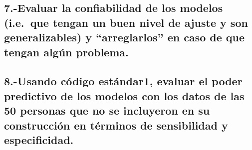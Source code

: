 \documentclass[
]{article}
\begin{document}
\subsection{7.-Evaluar la confiabilidad de los modelos (i.e.~que tengan
un buen nivel de ajuste y son generalizables) y ``arreglarlos'' en caso
de que tengan algún
problema.}\label{evaluar-la-confiabilidad-de-los-modelos-i.e.-que-tengan-un-buen-nivel-de-ajuste-y-son-generalizables-y-arreglarlos-en-caso-de-que-tengan-alguxfan-problema.}

\subsection{8.-Usando código estándar1, evaluar el poder predictivo de
los modelos con los datos de las 50 personas que no se incluyeron en su
construcción en términos de sensibilidad y
especificidad.}\label{usando-cuxf3digo-estuxe1ndar1-evaluar-el-poder-predictivo-de-los-modelos-con-los-datos-de-las-50-personas-que-no-se-incluyeron-en-su-construcciuxf3n-en-tuxe9rminos-de-sensibilidad-y-especificidad.}
\end{document}
